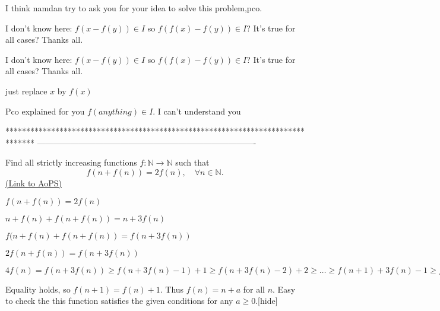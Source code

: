 \begin{solution}
	I think namdan try to ask you for your idea to solve this problem,pco.
\end{solution}



\begin{solution}
	I don't know here:
$f(x-f(y))\in I$ so $f(f(x)-f(y))\in I$?
It's true for all cases?
Thanks all.
\end{solution}



\begin{solution}
	\begin{tcolorbox}I don't know here:
$f(x-f(y))\in I$ so $f(f(x)-f(y))\in I$?
It's true for all cases?
Thanks all.\end{tcolorbox}
just replace $x$ by  $f(x)$
\end{solution}



\begin{solution}
	Pco explained for you $f(anything)\in I$. I can't understand you
\end{solution}
*******************************************************************************
-------------------------------------------------------------------------------

\begin{problem}
	Find all strictly increasing functions $f: \mathbb N \to \mathbb N$ such that
\[ f(n+f(n))=2f(n), \quad \forall n\in \mathbb {N}.\]
	\flushright \href{https://artofproblemsolving.com/community/c6h317477}{(Link to AoPS)}
\end{problem}



\begin{solution}$ f(n+f(n))=2f(n)$

$ n+f(n)+f(n+f(n))=n+3f(n)$

$ f(n+f(n)+f(n+f(n))=f(n+3f(n))$

$ 2f(n+f(n))=f(n+3f(n))$

$ 4f(n)=f(n+3f(n))\ge f(n+3f(n)-1)+1\ge f(n+3f(n)-2)+2\ge\ldots\ge f(n+1)+3f(n)-1\ge f(n)+3f(n)=4f(n)$

Equality holds, so $ f(n+1)=f(n)+1$. Thus $ f(n)=n+a$ for all $ n$. Easy to check the this function satisfies the given conditions for any $ a\ge0$.[\/hide]
\end{solution}



